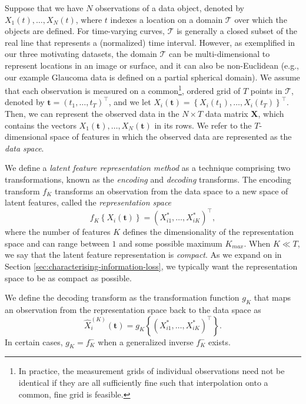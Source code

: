 Suppose that we have $N$ observations of a data object, denoted by $X_1 (t), \dots, X_N(t)$, where $t$ indexes a location on a domain $\mathcal{T}$ over which the objects are defined.
For time-varying curves, $\mathcal{T}$ is generally a closed subset of the real line that represents a (normalized) time interval.
However, as exemplified in our three motivating datasets, the domain $\mathcal{T}$ can be multi-dimensional to represent locations in an image or surface, and it can also be non-Euclidean (e.g., our example Glaucoma data is defined on a partial spherical domain).
We assume that each observation is measured on a common\footnote{In practice, the measurement grids of individual observations need not be identical if they are all sufficiently fine such that interpolation onto a common, fine grid is feasible.}, ordered grid of $T$ points in $\mathcal{T}$, denoted by $\mathbf{t} = \left(t_1, \dots, t_T\right)^\top$, and we let $X_i(\mathbf{t}) = \left\{X_i(t_1), \dots, X_i(t_T)\right\}^\top$.
Then, we can represent the observed data in the $N \times T$ data matrix $\mathbf{X}$, which contains the vectors $X_1(\mathbf{t}), \dots, X_N(\mathbf{t})$ in its rows.
We refer to the $T$-dimensional space of features in which the observed data are represented as the \emph{data space}.

We define a \emph{latent feature representation method} as a technique comprising two transformations, known as the \emph{encoding} and \emph{decoding} transforms.
The encoding transform $f_{K}$ transforms an observation from the data space to a new space of latent features, called the \emph{representation space}
$$
f_{K} \left\{X_i(\mathbf{t})\right\} = \left(X_{i1}^*, \dots,  X_{iK}^* \right)^\top,
$$
where the number of features $K$ defines the dimensionality of the representation space and can range between $1$ and some possible maximum $K_{max}$. When $K \ll T$, we say that the latent feature representation is \emph{compact}.
As we expand on in Section \ref{sec:characterising-information-loss}, we typically want the representation space to be as compact as possible.

We define the decoding transform as the transformation function $g_K$ that maps an observation from the representation space back to the data space as
$$
\widehat{X}_i^{(K)} (\mathbf{t}) = g_K \left\{ \left(X_{i1}^*, \dots,  X_{iK}^* \right)^\top \right\}.
$$
In certain cases, $g_K = f^{-}_K$ when a generalized inverse $f^{-}_K$ exists.

